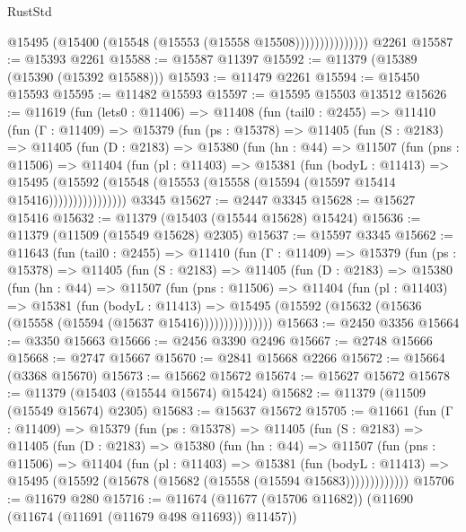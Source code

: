 \begin{lexlean}{RustStd}
\begin{coremodule}
                        @15495 (@15400 (@15548 (@15553 (@15558 @15508)))))))))))))))
    @2261
@15587 := @15393 @2261
@15588 := @15587 @11397
@15592 := @11379 (@15389 (@15390 (@15392 @15588)))
@15593 := @11479 @2261
@15594 := @15450 @15593
@15595 := @11482 @15593
@15597 := @15595 @15503 @13512
@15626 := @11619
    (fun (lets0 : @11406) =>
    @11408
      (fun (tail0 : @2455) =>
      @11410
        (fun (Γ : @11409) =>
        @15379
          (fun (ps : @15378) =>
          @11405
            (fun (S : @2183) =>
            @11405
              (fun (D : @2183) =>
              @15380
                (fun (hn : @44) =>
                @11507
                  (fun (pns : @11506) =>
                  @11404
                    (fun (pl : @11403) =>
                    @15381
                      (fun (bodyL : @11413) =>
                      @15495
                        (@15592
                          (@15548 (@15553 (@15558 (@15594 (@15597 @15414 @15416))))))))))))))))
    @3345
@15627 := @2447 @3345
@15628 := @15627 @15416
@15632 := @11379 (@15403 (@15544 @15628) @15424)
@15636 := @11379 (@11509 (@15549 @15628) @2305)
@15637 := @15597 @3345
@15662 := @11643
    (fun (tail0 : @2455) =>
    @11410
      (fun (Γ : @11409) =>
      @15379
        (fun (ps : @15378) =>
        @11405
          (fun (S : @2183) =>
          @11405
            (fun (D : @2183) =>
            @15380
              (fun (hn : @44) =>
              @11507
                (fun (pns : @11506) =>
                @11404
                  (fun (pl : @11403) =>
                  @15381
                    (fun (bodyL : @11413) =>
                    @15495 (@15592 (@15632 (@15636 (@15558 (@15594 (@15637 @15416)))))))))))))))
@15663 := @2450 @3356
@15664 := @3350 @15663
@15666 := @2456 @3390 @2496
@15667 := @2748 @15666
@15668 := @2747 @15667
@15670 := @2841 @15668 @2266
@15672 := @15664 (@3368 @15670)
@15673 := @15662 @15672
@15674 := @15627 @15672
@15678 := @11379 (@15403 (@15544 @15674) @15424)
@15682 := @11379 (@11509 (@15549 @15674) @2305)
@15683 := @15637 @15672
@15705 := @11661
    (fun (Γ : @11409) =>
    @15379
      (fun (ps : @15378) =>
      @11405
        (fun (S : @2183) =>
        @11405
          (fun (D : @2183) =>
          @15380
            (fun (hn : @44) =>
            @11507
              (fun (pns : @11506) =>
              @11404
                (fun (pl : @11403) =>
                @15381
                  (fun (bodyL : @11413) =>
                  @15495 (@15592 (@15678 (@15682 (@15558 (@15594 @15683)))))))))))))
@15706 := @11679 @280
@15716 := @11674 (@11677 (@15706 @11682)) (@11690 (@11674 (@11691 (@11679 @498 @11693)) @11457))

\end{coremodule}
\end{lexlean}

